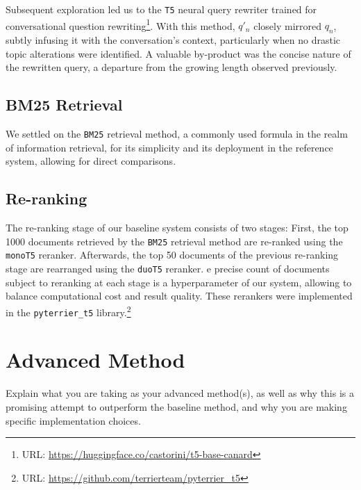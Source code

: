 \documentclass[sigconf]{acmart}
\begin{document}
Subsequent exploration led us to the \texttt{T5} neural query rewriter trained for conversational question rewriting\footnote{URL: \url{https://huggingface.co/castorini/t5-base-canard}}. With this method, $q'_n$ closely mirrored $q_n$, subtly infusing it with the conversation's context, particularly when no drastic topic alterations were identified. A valuable by-product was the concise nature of the rewritten query, a departure from the growing length observed previously.

\subsection{BM25 Retrieval}
We settled on the \texttt{BM25} retrieval method, a commonly used formula in the realm of information retrieval, for its simplicity and its deployment in the reference system, allowing for direct comparisons.

\subsection{Re-ranking}
The re-ranking stage of our baseline system consists of two stages: First, the top 1000 documents retrieved by the \texttt{BM25} retrieval method are re-ranked using the \texttt{monoT5} reranker. Afterwards, the top 50 documents of the previous re-ranking stage are rearranged using the \texttt{duoT5} reranker. e precise count of documents subject to reranking at each stage is a hyperparameter of our system, allowing to balance computational cost and result quality. These rerankers were implemented in the \texttt{pyterrier\_t5} library.\footnote{URL: \url{https://github.com/terrierteam/pyterrier_t5}}


\section{Advanced Method}\label{sec:advanced}
Explain what you are taking as your advanced method(s), as well as why this is a promising attempt to outperform the baseline method, and why you are making specific implementation choices.
\end{document}
